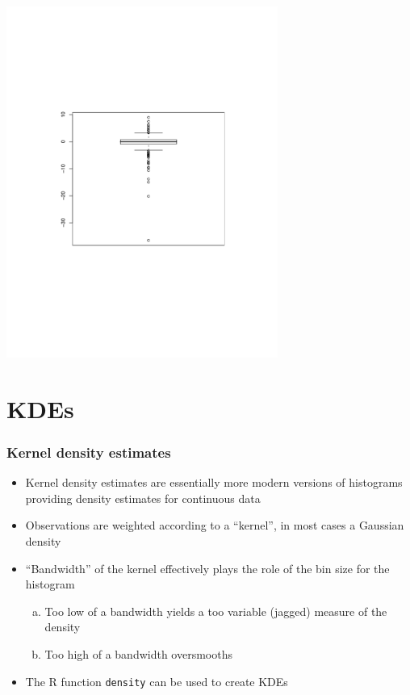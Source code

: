 \documentclass[aspectratio=169]{beamer}
\begin{document}
\begin{frame}
\includegraphics[width=3.5in]{boxplotBad.pdf}
\end{frame}

\section{KDEs}
\begin{frame}\frametitle{Kernel density estimates}
\begin{itemize}
\item Kernel density estimates are essentially more modern
  versions of histograms providing density estimates for
  continuous data
\item Observations are weighted according to a ``kernel'',
  in most cases a Gaussian density
\item ``Bandwidth'' of the kernel effectively plays the role of
  the bin size for the histogram
  \begin{enumerate}[a.]
  \item Too low of a bandwidth yields a too variable (jagged) measure
    of the density
  \item Too high of a bandwidth oversmooths
  \end{enumerate}
\item The R function \texttt{density} can be used to create KDEs
\end{itemize}
\end{frame}
\end{document}
